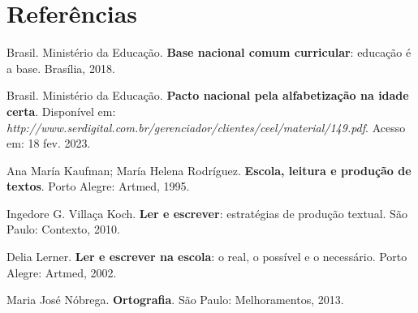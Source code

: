 \chapter{Referências}

\begin{myquote}
Brasil. Ministério da Educação. \textbf{Base nacional comum curricular}:
educação é a base. Brasília, 2018.

Brasil. Ministério da Educação. \textbf{Pacto nacional pela
alfabetização na idade certa}. Disponível em:
\emph{http://www.serdigital.com.br/gerenciador/clientes/ceel/material/149.pdf}.
Acesso em: 18 fev. 2023.

Ana María Kaufman; María Helena Rodríguez. \textbf{Escola, leitura e
produção de textos}. Porto Alegre: Artmed, 1995.

Ingedore G. Villaça Koch. \textbf{Ler e escrever}: estratégias de
produção textual. São Paulo: Contexto, 2010.

Delia Lerner. \textbf{Ler e escrever na escola}: o real, o possível e o
necessário. Porto Alegre: Artmed, 2002.

Maria José Nóbrega. \textbf{Ortografia}. São Paulo: Melhoramentos, 2013.
\end{myquote}